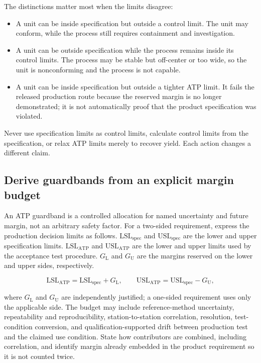 The distinctions matter most when the limits disagree:

\begin{itemize}
\item A unit can be inside specification but outside a control limit. The unit
      may conform, while the process still requires containment and
      investigation.
\item A unit can be outside specification while the process remains inside its
      control limits. The process may be stable but off-center or too wide, so
      the unit is nonconforming and the process is not capable.
\item A unit can be inside specification but outside a tighter ATP limit. It
      fails the released production route because the reserved margin is no
      longer demonstrated; it is not automatically proof that the product
      specification was violated.
\end{itemize}

Never use specification limits as control limits, calculate control limits from
the specification, or relax ATP limits merely to recover yield. Each action
changes a different claim.

\subsection{Derive guardbands from an explicit margin budget}

An ATP guardband is a controlled allocation for named uncertainty and future
margin, not an arbitrary safety factor. For a two-sided requirement, express
the production decision limits as follows. $\mathrm{LSL}_{\mathrm{spec}}$ and
$\mathrm{USL}_{\mathrm{spec}}$ are the lower and upper specification limits.
$\mathrm{LSL}_{\mathrm{ATP}}$ and $\mathrm{USL}_{\mathrm{ATP}}$ are the lower
and upper limits used by the acceptance test procedure. $G_{\mathrm{L}}$ and
$G_{\mathrm{U}}$ are the margins reserved on the lower and upper sides,
respectively.

\begin{equation}
\mathrm{LSL}_{\mathrm{ATP}}=\mathrm{LSL}_{\mathrm{spec}}+G_{\mathrm{L}},
\qquad
\mathrm{USL}_{\mathrm{ATP}}=\mathrm{USL}_{\mathrm{spec}}-G_{\mathrm{U}},
\end{equation}

where $G_{\mathrm{L}}$ and $G_{\mathrm{U}}$ are independently justified; a
one-sided requirement uses only the applicable side. The budget may include
reference-method uncertainty, repeatability and reproducibility,
station-to-station correlation, resolution, test-condition conversion, and
qualification-supported drift between production test and the claimed use
condition. State how contributors are combined, including correlation, and
identify margin already embedded in the product requirement so it is not
counted twice.

